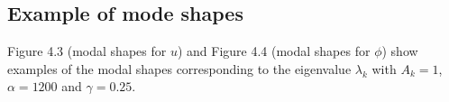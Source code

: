 \documentclass[../../main.tex]{subfiles}
\begin{document}
\subsection{Example of mode shapes}
 Figure 4.3 (modal shapes for $u$) and Figure 4.4 (modal shapes for $\phi$) show examples of the modal shapes corresponding to the eigenvalue $\lambda_k$ with $A_k = 1$, $\alpha = 1200$ and $\gamma = 0.25$.
\FloatBarrier
\begin{figure}[h!]
	
	

\end{figure}
\end{document}
